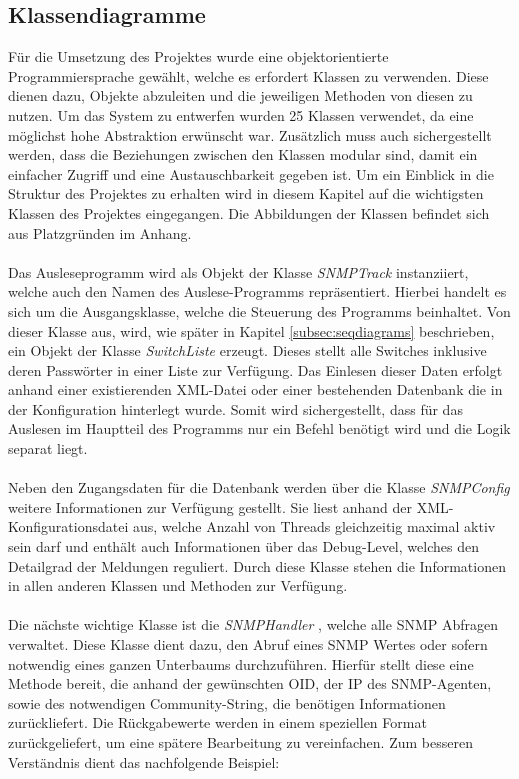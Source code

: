 \subsection{Klassendiagramme}
\label{subsec:classdiagrams}

Für die Umsetzung des Projektes wurde eine objektorientierte Programmiersprache gewählt, welche es erfordert Klassen zu verwenden.
Diese dienen dazu, Objekte abzuleiten und die jeweiligen Methoden von diesen zu nutzen.
Um das System zu entwerfen wurden 25 Klassen verwendet, da eine möglichst hohe Abstraktion erwünscht war.
Zusätzlich muss auch sichergestellt werden, dass die Beziehungen zwischen den Klassen modular sind, damit ein einfacher Zugriff und eine Austauschbarkeit gegeben ist.
Um ein Einblick in die Struktur des Projektes zu erhalten wird in diesem Kapitel auf die wichtigsten Klassen des Projektes eingegangen.
Die Abbildungen der Klassen befindet sich aus Platzgründen im Anhang.\\\\
Das Ausleseprogramm wird als Objekt der Klasse \textit{SNMPTrack} instanziiert, welche auch den Namen des Auslese-Programms repräsentiert.
Hierbei handelt es sich um die Ausgangsklasse, welche die Steuerung des Programms beinhaltet. Von dieser Klasse aus, wird, wie später in Kapitel \ref{subsec:seqdiagrams} beschrieben, ein Objekt der Klasse \textit{SwitchListe} erzeugt.
Dieses stellt alle Switches inklusive deren Passwörter in einer Liste zur Verfügung.
Das Einlesen dieser Daten erfolgt anhand einer existierenden XML-Datei oder einer bestehenden Datenbank die in der Konfiguration hinterlegt wurde.
Somit wird sichergestellt, dass für das Auslesen im Hauptteil des Programms nur ein Befehl benötigt wird und die Logik separat liegt.\\\\
Neben den Zugangsdaten für die Datenbank werden über die Klasse \textit{SNMPConfig} weitere Informationen zur Verfügung gestellt.
Sie liest anhand der XML-Konfigurationsdatei aus, welche Anzahl von Threads gleichzeitig maximal aktiv sein darf und enthält auch Informationen über das Debug-Level, welches den Detailgrad der Meldungen reguliert.
Durch diese Klasse stehen die Informationen in allen anderen Klassen und Methoden zur Verfügung.\\\\
Die nächste wichtige Klasse ist die \textit{SNMPHandler} , welche alle SNMP Abfragen verwaltet.
Diese Klasse dient dazu, den Abruf eines SNMP Wertes oder sofern notwendig eines ganzen Unterbaums durchzuführen.
Hierfür stellt diese eine Methode bereit, die anhand der gewünschten OID, der IP des SNMP-Agenten, sowie des notwendigen Community-String, die benötigen Informationen  zurückliefert.
Die Rückgabewerte werden in einem speziellen Format zurückgeliefert, um eine spätere Bearbeitung zu vereinfachen. Zum besseren Verständnis dient das nachfolgende Beispiel:\\

